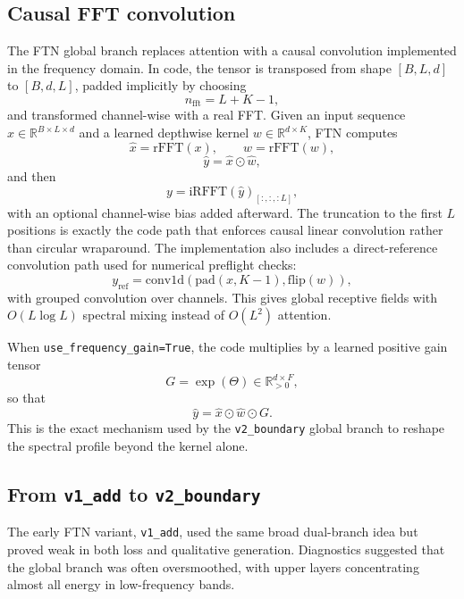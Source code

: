 \documentclass[11pt]{article}
\begin{document}
\subsection{Causal FFT convolution}
The FTN global branch replaces attention with a causal convolution implemented in the frequency domain. In code, the tensor is transposed from shape $[B,L,d]$ to $[B,d,L]$, padded implicitly by choosing
\begin{equation}
    n_{\mathrm{fft}} = L + K - 1,
\end{equation}
and transformed channel-wise with a real FFT. Given an input sequence $x \in \mathbb{R}^{B \times L \times d}$ and a learned depthwise kernel $w \in \mathbb{R}^{d \times K}$, FTN computes
\begin{equation}
    \widehat{x} = \mathrm{rFFT}(x), \qquad \widehat{w} = \mathrm{rFFT}(w),
\end{equation}
\begin{equation}
    \widehat{y} = \widehat{x} \odot \widehat{w},
\end{equation}
and then
\begin{equation}
    y = \mathrm{iRFFT}(\widehat{y})_{[:, :, :L]},
\end{equation}
with an optional channel-wise bias added afterward. The truncation to the first $L$ positions is exactly the code path that enforces causal linear convolution rather than circular wraparound. The implementation also includes a direct-reference convolution path used for numerical preflight checks:
\begin{equation}
    y_{\mathrm{ref}} = \mathrm{conv1d}\left(\mathrm{pad}(x, K-1), \mathrm{flip}(w)\right),
\end{equation}
with grouped convolution over channels. This gives global receptive fields with $O(L \log L)$ spectral mixing instead of $O(L^2)$ attention.

When \texttt{use\_frequency\_gain=True}, the code multiplies by a learned positive gain tensor
\begin{equation}
    G = \exp(\Theta) \in \mathbb{R}_{>0}^{d \times F},
\end{equation}
so that
\begin{equation}
    \widehat{y} = \widehat{x} \odot \widehat{w} \odot G.
\end{equation}
This is the exact mechanism used by the \texttt{v2\_boundary} global branch to reshape the spectral profile beyond the kernel alone.

\subsection{From \texttt{v1\_add} to \texttt{v2\_boundary}}
The early FTN variant, \texttt{v1\_add}, used the same broad dual-branch idea but proved weak in both loss and qualitative generation. Diagnostics suggested that the global branch was often oversmoothed, with upper layers concentrating almost all energy in low-frequency bands.
\end{document}
